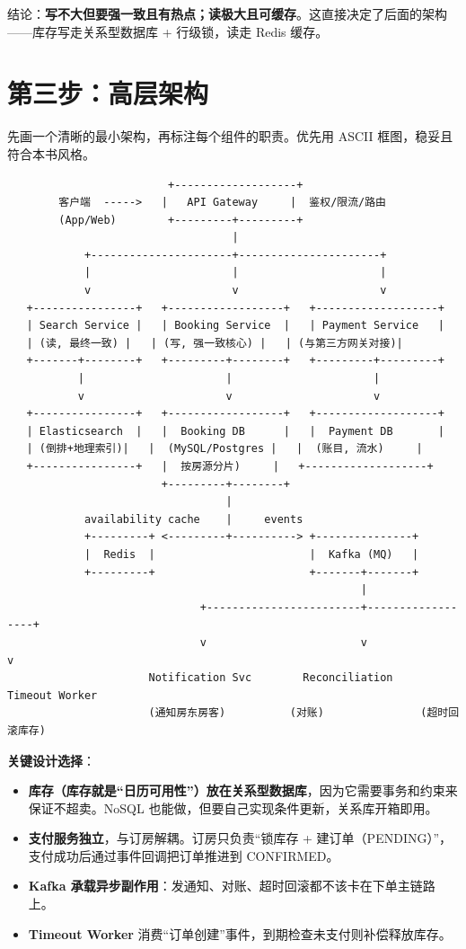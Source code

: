 结论：\textbf{写不大但要强一致且有热点；读极大且可缓存}。这直接决定了后面的架构——库存写走关系型数据库 + 行级锁，读走 Redis 缓存。

\section{第三步：高层架构}

先画一个清晰的最小架构，再标注每个组件的职责。优先用 ASCII 框图，稳妥且符合本书风格。

\begin{lstlisting}
                         +-------------------+
        客户端  ----->   |   API Gateway     |  鉴权/限流/路由
        (App/Web)        +---------+---------+
                                   |
            +----------------------+----------------------+
            |                      |                      |
            v                      v                      v
   +----------------+   +------------------+   +-------------------+
   | Search Service |   | Booking Service  |   | Payment Service   |
   | (读, 最终一致) |   | (写, 强一致核心) |   | (与第三方网关对接)|
   +-------+--------+   +---------+--------+   +---------+---------+
           |                      |                      |
           v                      v                      v
   +----------------+   +------------------+   +-------------------+
   | Elasticsearch  |   |  Booking DB      |   |  Payment DB       |
   | (倒排+地理索引)|   |  (MySQL/Postgres |   |  (账目, 流水)     |
   +----------------+   |  按房源分片)     |   +-------------------+
                        +---------+--------+
                                  |
            availability cache    |     events
            +---------+ <---------+----------> +---------------+
            |  Redis  |                        |  Kafka (MQ)   |
            +---------+                        +-------+-------+
                                                       |
                              +------------------------+------------------+
                              v                        v                  v
                      Notification Svc        Reconciliation       Timeout Worker
                      (通知房东房客)          (对账)               (超时回滚库存)
\end{lstlisting}

\textbf{关键设计选择}：

\begin{itemize}
  \item \textbf{库存（库存就是“日历可用性”）放在关系型数据库}，因为它需要事务和约束来保证不超卖。NoSQL 也能做，但要自己实现条件更新，关系库开箱即用。
  \item \textbf{支付服务独立}，与订房解耦。订房只负责“锁库存 + 建订单（PENDING）”，支付成功后通过事件回调把订单推进到 CONFIRMED。
  \item \textbf{Kafka 承载异步副作用}：发通知、对账、超时回滚都不该卡在下单主链路上。
  \item \textbf{Timeout Worker} 消费“订单创建”事件，到期检查未支付则补偿释放库存。
\end{itemize}

